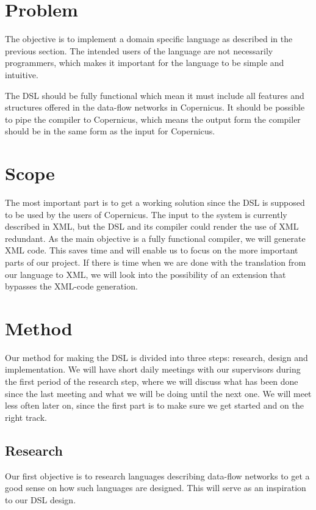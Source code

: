 \documentclass[a4paper]{article}
\begin{document}
\section{Problem}
The objective is to implement a domain specific language as described
in the previous section. The intended users of the language are not
necessarily programmers, which makes it important for the language to be
simple and intuitive.

The DSL should be fully functional which mean it must include all
features and structures offered in the data-flow networks in
Copernicus. It should be possible to pipe the compiler to Copernicus,
which means the output form the compiler should be in the same form as
the input for Copernicus.


\section{Scope}
The most important part is to get a working solution since the DSL is
supposed to be used by the users of Copernicus. The input to the
system is currently described in XML, but the DSL and its compiler
could render the use of XML redundant. As the main objective is a
fully functional compiler, we will generate XML code. This saves time
and will enable us to focus on the more important parts of our
project. If there is time when we are done with the translation from
our language to XML, we will look into the possibility of an extension
that bypasses the XML-code generation.

\section{Method}
Our method for making the DSL is divided into three steps: research,
design and implementation. We will have short daily meetings with our
supervisors during the first period of the research step, where we
will discuss what has been done since the last meeting and what we
will be doing until the next one. We will meet less often later on,
since the first part is to make sure we get started and on the right
track.

\subsection{Research}
Our first objective is to research languages describing data-flow
networks to get a good sense on how such languages are designed. This
will serve as an inspiration to our DSL design.
\end{document}
